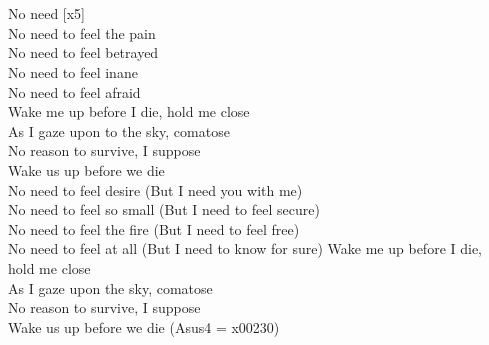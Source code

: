 
\tab{}\tab{}\\
\tab{}\tab{}\\
No need [x5]\\
No need to feel the pain\tab{}\\
No need to feel betrayed\tab{}\\
No need to feel inane\tab{}\\
No need to feel afraid\tab{}\\
\hops
{} Wake me up before I die, hold me close\tab{}\\
 As I gaze upon to the sky, comatose\tab{}\\
 No reason to survive, I suppose\tab{}\\
 Wake us up before we die\tab{}\tab{}\\
\hops
No need to feel desire (But I need you with me)\\
No need to feel so small (But I need to feel secure)\\
No need to feel the fire (But I need to feel free)\\
No need to feel at all (But I need to know for sure)
\hops
{} Wake me up before I die, hold me close\\
 As I gaze upon the sky, comatose\\
 No reason to survive, I suppose\\
 Wake us up before we die
\hops\hops
(Asus4 = x00230)

\clearpage
{}

